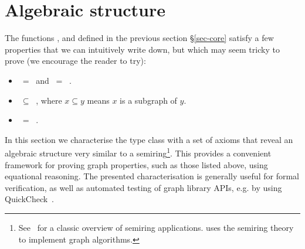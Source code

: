 \section{Algebraic structure}\label{sec-algebra}

The functions ,  and  defined in the previous
section \S\ref{sec-core} satisfy a few properties that we can intuitively write down,
but which may seem tricky to prove (we encourage the reader to try):
\begin{itemize}
    \item {} $\ =\ $  and  $\ =\ $ .
    \item {} $\ \subseteq\ $ , where $x \subseteq y$ means
    $x$ is a subgraph of $y$.
    \item {} $\ =\ $ .
\end{itemize}

In this section we characterise the  type class with a set of
axioms that reveal an algebraic structure very similar to a semiring\footnote{
See~\citet{1999_semirings_golan} for a classic overview of semiring
applications. \citet{2013_semirings_dolan} uses the semiring theory
to implement graph algorithms.}.
This provides a convenient framework for proving graph properties, such as
those listed above, using equational
reasoning. The presented characterisation is generally useful for formal
verification, as well as automated testing
of graph library APIs, e.g. by using QuickCheck~\cite{2011_quickcheck_claessen}.

